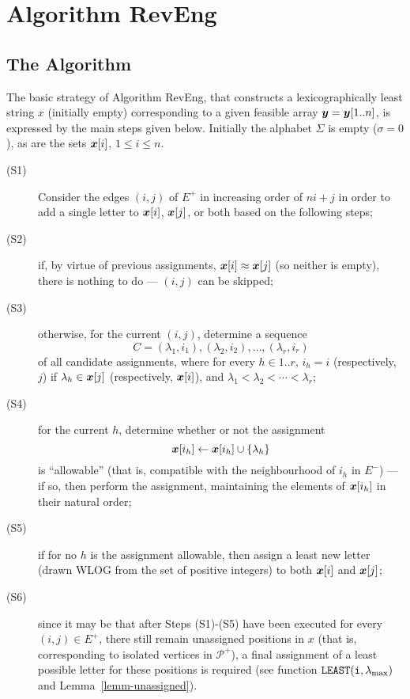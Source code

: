 \documentclass[runningheads,a4paper]{llncs}
\def\s#1{\mbox{\boldmath $#1$}}
\def\+{\!+\!}
\def\match{\approx}
\def\la{\leftarrow}
\def\LEAST{\tt{LEAST}}
\begin{document}
\section{Algorithm RevEng}
\label{sect-alg}

\subsection{The Algorithm}
The basic strategy of Algorithm RevEng, that constructs a lexicographically least
string \s{x} (initially empty)
corresponding to a given feasible array $\s{y} = \s{y}[1..n]$, is
expressed by the main steps given below.
Initially the alphabet $\Sigma$ is empty ($\sigma = 0$), as are the sets $\s{x}[i]$,
$1 \le i \le n$.
\begin{description}
\item[(S1)]
Consider the edges $(i,j)$ of $E^+$ in increasing order of $ni\+ j$
in order to add a single letter to $\s{x}[i]$, $\s{x}[j]$, or both based on the following steps;
\item[(S2)]
if, by virtue of previous assignments, $\s{x}[i] \match \s{x}[j]$
(so neither is empty),
there is nothing to do --- $(i,j)$ can be skipped;
\item[(S3)]
otherwise, for the current $(i,j)$, determine a sequence
$$C = (\lambda_1,i_1),(\lambda_2,i_2),\ldots,(\lambda_r,i_r)$$
of all candidate assignments,
where for every $h \in 1..r$, $i_h = i$ (respectively, $j$)
if $\lambda_h \in \s{x}[j]$ (respectively, $\s{x}[i]$),
and $\lambda_1 < \lambda_2 < \cdots < \lambda_r$;
\item[(S4)]
for the current $h$, determine whether or not the assignment
$$\s{x}[i_h] \la \s{x}[i_h] \cup \{\lambda_h\}$$
is ``allowable'' (that is, compatible with
the neighbourhood of $i_h$ in $E^-$) --- if so,
then perform the assignment,
maintaining the elements of $\s{x}[i_h]$ in their natural order;
\item[(S5)]
if for no $h$ is the assignment allowable,
then assign a least new letter (drawn WLOG from the set of positive integers)
to both $\s{x}[i]$ and $\s{x}[j]$;
\item[(S6)]
since it may be that after Steps (S1)-(S5) have been executed
for every $(i,j) \in E^+$, there still remain unassigned positions in \s{x}
(that is, corresponding to isolated vertices in $\mathcal{P}^+$),
a final assignment of a least possible letter for these positions
is required (see function $\LEAST(i,\lambda_{\max})$ and Lemma~\ref{lemm-unassigned}).
\end{description}
\end{document}
